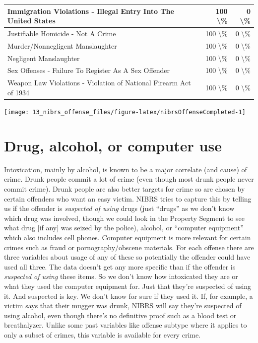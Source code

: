\documentclass[
]{krantz}
\let\origfigure\figure
\let\endorigfigure\endfigure
\renewenvironment{figure}[1][2] {
    \expandafter\origfigure\expandafter[H]
} {
    \endorigfigure
}
\begin{document}
\begin{longtable}[t]{l|r|r}
\hline
Immigration Violations - Illegal Entry Into The United States & 100 \textbackslash{}\% & 0 \textbackslash{}\%\\
\hline
Justifiable Homicide - Not A Crime & 100 \textbackslash{}\% & 0 \textbackslash{}\%\\
\hline
Murder/Nonnegligent Manslaughter & 100 \textbackslash{}\% & 0 \textbackslash{}\%\\
\hline
Negligent Manslaughter & 100 \textbackslash{}\% & 0 \textbackslash{}\%\\
\hline
Sex Offenses - Failure To Register As A Sex Offender & 100 \textbackslash{}\% & 0 \textbackslash{}\%\\
\hline
Weapon Law Violations - Violation of National Firearm Act of 1934 & 100 \textbackslash{}\% & 0 \textbackslash{}\%\\
\hline
\end{longtable}

\begin{figure}

{\centering \texttt{[image: 13\_nibrs\_offense\_files/figure-latex/nibrsOffenseCompleted-1]} 

}

\caption{The annual percent of offenses reported as completed, 1991-2022.}\label{fig:nibrsOffenseCompleted}
\end{figure}

\section{Drug, alcohol, or computer
use}\label{drug-alcohol-or-computer-use}

Intoxication, mainly by alcohol, is known to be a major
correlate (and cause) of crime. Drunk people commit a lot of
crime (even though most drunk people never commit crime).
Drunk people are also better targets for crime so are chosen
by certain offenders who want an easy victim. NIBRS tries to
capture this by telling us if the offender is
\emph{suspected of using} drugs (just ``drugs'' as we don't
know which drug was involved, though we could look in the
Property Segment to see what drug {[}if any{]} was seized by
the police), alcohol, or ``computer equipment'' which also
includes cell phones. Computer equipment is more relevant
for certain crimes such as fraud or pornography/obscene
materials. For each offense there are three variables about
usage of any of these so potentially the offender could have
used all three. The data doesn't get any more specific than
if the offender is \emph{suspected of using} these items. So
we don't know how intoxicated they are or what they used the
computer equipment for. Just that they're suspected of using
it. And suspected is key. We don't know for sure if they
used it. If, for example, a victim says that their mugger
was drunk, NIBRS will say they're suspected of using
alcohol, even though there's no definitive proof such as a
blood test or breathalyzer. Unlike some past variables like
offense subtype where it applies to only a subset of crimes,
this variable is available for every crime.
\end{document}
